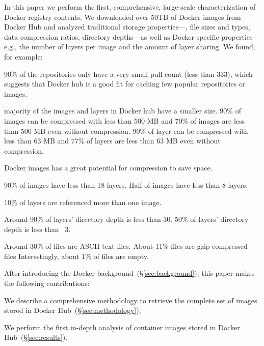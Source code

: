 In this paper we perform the first, comprehensive, large-scale characterization of
Docker registry contents.
%
We downloaded over 50TB of Docker images from Docker Hub and analyzed
traditional storage properties---\eg, file sizes and types, data compression
ratios, directory depths---as well as Docker-specific properties---e.g., the number
of layers per image and the amount of layer sharing.
%
%
We found, for example:
\begin{compactenumerate}
	\item 90\% of the repositories only have a very small pull count (less than 333), which suggests that Docker hub is a good fit for caching few popular repositories or images.
	\item majority of the images and layers in Docker hub have a smaller size. 90\% of images can be compressed with less than 500 MB and 70\% of images are less than 500 MB even without compression. 90\% of layer can be compressed with less than 63 MB and 77\% of layers are less than 63 MB even without compression.
	\item Docker images has a great potential for compression to save space.
	\item 90\% of images have less than 18 layers. Half of images have less than 8 layers. 
	\item 10\% of layers are referenced more than one image.
	\item Around 90\% of layers' directory depth is less than 30. 50\% of layers' directory depth is less than ~3.
	\item Around 30\% of files are ASCII text files. 
	About 11\% files are gzip compressed files 
	Interestingly, about 1\% of files are empty. 
\end{compactenumerate}
%

%

After introducing the Docker background~(\S\ref{sec:background}),
this paper makes the following contributions:
\begin{compactenumerate}
  \item We describe a comprehensive methodology to retrieve the complete set of
  	images stored in Docker Hub~(\S\ref{sec:methodology});
  \item We perform the first in-depth analysis of container images stored in
    Docker Hub~(\S\ref{sec:results}).
\end{compactenumerate}

